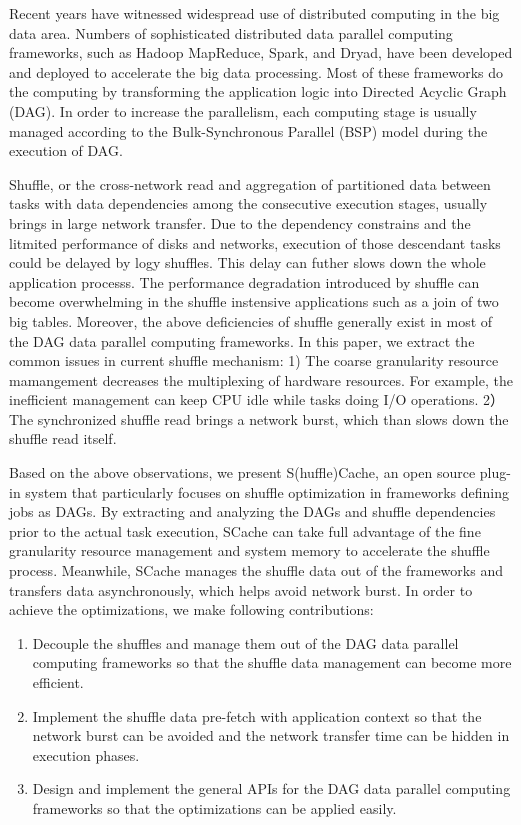 \begin{englishabstract}

Recent years have witnessed widespread use of distributed computing in the big data area.
Numbers of sophisticated distributed data parallel computing frameworks, such as Hadoop MapReduce\cite{mapreduce}, Spark\cite{spark}, and Dryad\cite{dryad}, 
have been developed and deployed to accelerate the big data processing.
Most of these frameworks do the computing by transforming the application logic into Directed Acyclic Graph (DAG).
In order to increase the parallelism, each computing stage is usually managed according to the Bulk-Synchronous Parallel (BSP) model during the execution of DAG.

Shuffle, or the cross-network read and aggregation of partitioned data between tasks with data dependencies among the consecutive execution stages, 
usually brings in large network transfer. 
Due to the dependency constrains and the litmited performance of disks and networks, execution of those descendant tasks could be delayed by logy shuffles. 
This delay can futher slows down the whole application processs. 
The performance degradation introduced by shuffle can become overwhelming in the shuffle instensive applications such as a join of two big tables.
Moreover, the above deficiencies of shuffle generally exist in most of the DAG data parallel computing frameworks. 
In this paper, we extract the common issues in current shuffle mechanism: 
1) The coarse granularity resource mamangement decreases the multiplexing of hardware resources. For example, the inefficient management can keep CPU idle while tasks doing I/O operations.
2）The synchronized shuffle read brings a network burst, which than slows down the shuffle read itself.

Based on the above observations, we present S(huffle)Cache, an open source plug-in system that particularly focuses on shuffle optimization in frameworks defining jobs as DAGs. 
By extracting and analyzing the DAGs and shuffle dependencies prior to the actual task execution, 
SCache can take full advantage of the fine granularity resource management and system memory to accelerate the shuffle process. 
Meanwhile, SCache manages the shuffle data out of the frameworks and transfers data asynchronously, which helps avoid network burst.
In order to achieve the optimizations, we make following contributions:

\begin{enumerate}
    \item Decouple the shuffles and manage them out of the DAG data parallel computing frameworks so that the shuffle data management can become more efficient.
    \item Implement the shuffle data pre-fetch with application context so that the network burst can be avoided and the network transfer time can be hidden in execution phases.
    \item Design and implement the general APIs for the DAG data parallel computing frameworks so that the optimizations can be applied easily.
\end{enumerate}


\end{englishabstract}
